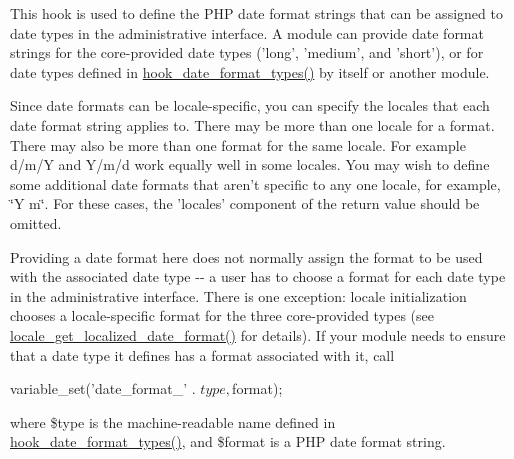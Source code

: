 This hook is used to define the PHP date format strings that can be assigned to date types in the administrative interface. A module can provide date format strings for the core-\/provided date types ('long', 'medium', and 'short'), or for date types defined in \hyperlink{group__hooks_gaadde7af71d0b4f827cf7aac1c88c4d23}{hook\_\-date\_\-format\_\-types()} by itself or another module.

Since date formats can be locale-\/specific, you can specify the locales that each date format string applies to. There may be more than one locale for a format. There may also be more than one format for the same locale. For example d/m/Y and Y/m/d work equally well in some locales. You may wish to define some additional date formats that aren't specific to any one locale, for example, \char`\"{}Y m\char`\"{}. For these cases, the 'locales' component of the return value should be omitted.

Providing a date format here does not normally assign the format to be used with the associated date type -\/-\/ a user has to choose a format for each date type in the administrative interface. There is one exception: locale initialization chooses a locale-\/specific format for the three core-\/provided types (see \hyperlink{locale_8inc_a1e11debad1c66255e8a096ef09dde589}{locale\_\-get\_\-localized\_\-date\_\-format()} for details). If your module needs to ensure that a date type it defines has a format associated with it, call 
\begin{DoxyCode}
 variable_set('date_format_' . $type, $format); 
\end{DoxyCode}
 where \$type is the machine-\/readable name defined in \hyperlink{group__hooks_gaadde7af71d0b4f827cf7aac1c88c4d23}{hook\_\-date\_\-format\_\-types()}, and \$format is a PHP date format string.

